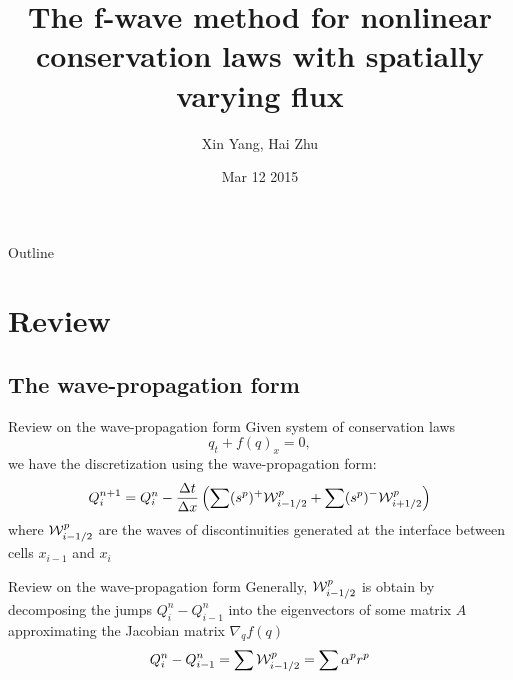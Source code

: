 \documentclass{beamer}
\title%
{The f-wave method for nonlinear conservation laws with spatially varying flux}
\author%
{Xin Yang, Hai Zhu}
\institute[University of Washington] %
{
  Course project for Amath 574\\
  Department of Applied Mathematics\\
  University of Washington
}
\date[03/12/2015] %
{Mar 12 2015}
\begin{document}
\begin{frame}
  \titlepage
\end{frame}

\begin{frame}{Outline}
  \tableofcontents
\end{frame}





\section{Review}
\subsection{The wave-propagation form}
\begin{frame}{Review on the wave-propagation form}
Given system of conservation laws
\[
q_t+f(q)_x=0,
\]
we have the discretization using the wave-propagation form: 
\[
Q^{n+1}_i=Q^{n}_i-\frac{\Delta t}{\Delta x}\left(\sum (s^p)^+{\cal W}_{i-1/2}^p+\sum (s^p)^-{\cal W}_{i+1/2}^p\right)
\]
where ${\cal W}^p_{i-1/2}$ are the waves of discontinuities generated at the interface between cells $x_{i-1}$ and $x_{i}$ 
\end{frame}
\begin{frame}{Review on the wave-propagation form}
Generally, ${\cal W}^p_{i-1/2}$ is obtain by decomposing the jumps $Q_i^n-Q_{i-1}^n$ into the eigenvectors of some matrix $A$ approximating the Jacobian matrix $ \nabla_q f(q) $
\[
Q_i^n-Q_{i-1}^n=\sum {\cal W}^p_{i-1/2}=\sum \alpha^p r^p 
\]
\end{frame}
\end{document}
